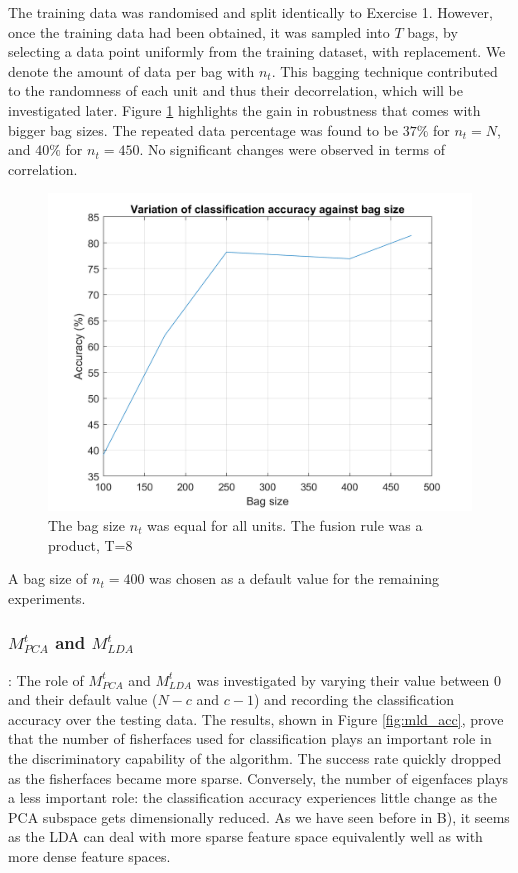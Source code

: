 \documentclass[10pt,technote]{IEEEtran}
\begin{document}
The training data was randomised and split identically to Exercise 1. However, once the training data had been obtained, it was sampled into $T$ bags, by selecting a data point uniformly from the training dataset, with replacement. We denote the amount of data per bag with $n_t$. This bagging technique contributed to the randomness of each unit and thus their decorrelation, which will be investigated later. Figure \ref{fig:acc_vs_bag} highlights the gain in robustness that comes with bigger bag sizes. The repeated data percentage was found to be $37 \%$ for $n_t = N$, and $40 \%$ for $n_t = 450$. No significant changes were observed in terms of correlation.
\begin{figure}[htb!]
    \centering
    \includegraphics[width=\linewidth]{../results/ex2LDAEnsemble/acc_vs_bag_size.png}
    \caption{The bag size $n_t$ was equal for all units. The fusion rule was a product, T=8}
    \label{fig:acc_vs_bag}
\end{figure}

A bag size of $n_t = 400$ was chosen as a default value for the remaining experiments.

\subsubsection{$M_{PCA}^t$ and $M_{LDA}^t$}:
The role of $M_{PCA}^t$ and $M_{LDA}^t$ was investigated by varying their value between 0 and their default value ($N - c$ and $c - 1$) and recording the classification accuracy over the testing data. The results, shown in Figure \ref{fig:mld_acc}, prove that the number of fisherfaces used for classification plays an important role in the discriminatory capability of the algorithm. The success rate quickly dropped as the fisherfaces became more sparse. Conversely, the number of eigenfaces plays a less important role: the classification accuracy experiences little change as the PCA subspace gets dimensionally reduced. As we have seen before in B), it seems as the LDA can deal with more sparse feature space equivalently well as with more dense feature spaces.
\end{document}
